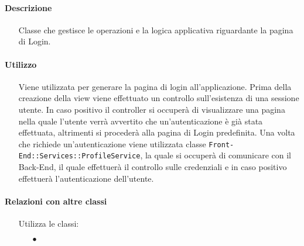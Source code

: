 \paragraph*{Descrizione}
\begin{itemize}
\item[] Classe che gestisce le operazioni e la logica applicativa riguardante la pagina di Login.
\end{itemize}

\paragraph*{Utilizzo}
\begin{itemize}
\item[] Viene utilizzata per generare la pagina di login all'applicazione. Prima della creazione della view viene effettuato un controllo sull'esistenza di una sessione utente. In caso positivo il controller si occuperà di visualizzare una pagina nella quale l'utente verrà avvertito che un'autenticazione è già stata effettuata, altrimenti si procederà alla pagina di Login predefinita. Una volta che richiede un'autenticazione viene utilizzata classe \texttt{Front-End::Services::ProfileService}, la quale si occuperà di comunicare con il Back-End, il quale effettuerà il controllo sulle credenziali e in caso positivo effettuerà l'autenticazione dell'utente.
\end{itemize}

\paragraph*{Relazioni con altre classi}
\begin{itemize}


\item[] Utilizza le classi:
\begin{itemize}
\item[$\bullet$] 
\end{itemize}
\end{itemize}

